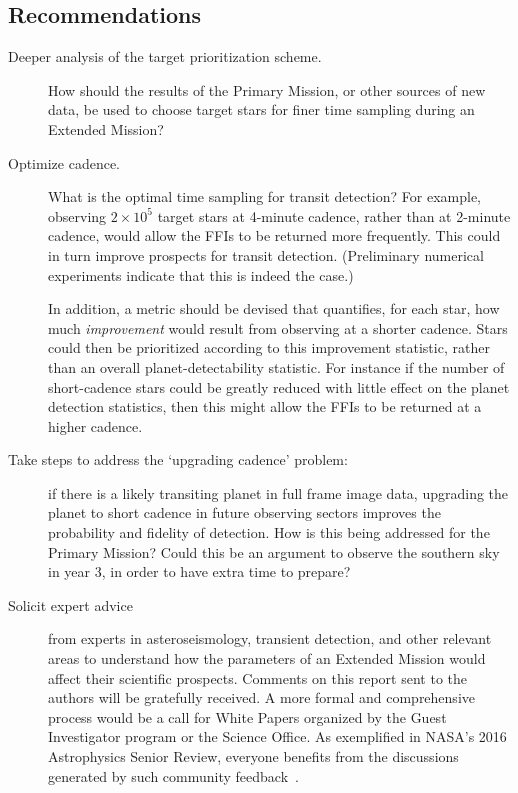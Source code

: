 \subsection{Recommendations}
\label{sec:recommendations}
\begin{description}
  
	\item[Deeper analysis of the target prioritization scheme.] How should the
	results of the Primary Mission, or other sources of new data, be used to
	choose target stars for finer time sampling during an Extended Mission?
	
    \item[Optimize cadence.] What is the optimal time sampling for transit 
    detection? For example, observing $2\times10^5$ target stars at 
    4-minute cadence, rather than at 2-minute cadence,
    would allow the FFIs to be returned more frequently.
    This could in turn improve prospects for transit detection.  
    (Preliminary numerical experiments indicate that this is indeed the 
    case.)
	      
	      In addition, a metric should be devised that
        quantifies, for each star, how much {\it improvement} would
        result from observing at a shorter cadence.
        Stars could then be prioritized according to this improvement
	statistic, rather than an overall planet-detectability statistic.
        For instance if the number of short-cadence stars could be 
        greatly reduced with little effect on the planet detection
        statistics, then this might allow the FFIs to be returned at a
        higher cadence.
	
	\item[Take steps to address the `upgrading cadence' problem:]
          if there is a likely transiting planet in full frame image
          data, upgrading the planet to short cadence in future
          observing sectors improves the probability and fidelity of
          detection. How is this being addressed for the Primary Mission?
          Could this be an argument to observe the southern
          sky in year 3, in order to have extra time to prepare?
	
	\item[Solicit expert advice] from experts in asteroseismology, transient detection,
	and other relevant areas to understand how the parameters of an Extended Mission
          would affect their scientific prospects. Comments on this report sent to
	  the authors will be gratefully received. A more formal and comprehensive process would
          be a call for White Papers organized
	  by the Guest Investigator program or the \tess Science Office. As
          exemplified in NASA’s 2016 Astrophysics Senior Review,
          everyone benefits from the discussions generated by such
          community feedback~\citep{donahue_senior_2016}.
	

\end{description}
